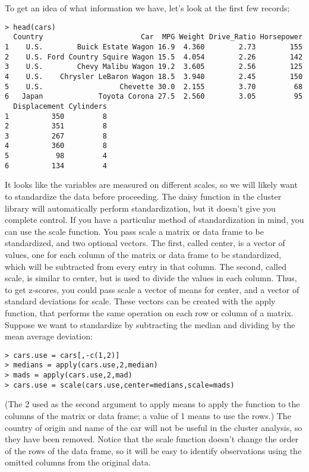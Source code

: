 {\begin{framed}
\begin{verbatim}
\end{verbatim}
\end{framed}
To get an idea of what information we have, let's look at the first few records;
\begin{framed}
\begin{verbatim} 
> head(cars) 
  Country                       Car  MPG Weight Drive_Ratio Horsepower
1    U.S.        Buick Estate Wagon 16.9  4.360        2.73        155
2    U.S. Ford Country Squire Wagon 15.5  4.054        2.26        142
3    U.S.        Chevy Malibu Wagon 19.2  3.605        2.56        125
4    U.S.    Chrysler LeBaron Wagon 18.5  3.940        2.45        150
5    U.S.                  Chevette 30.0  2.155        3.70         68
6   Japan             Toyota Corona 27.5  2.560        3.05         95
  Displacement Cylinders
1          350         8
2          351         8
3          267         8
4          360         8
5           98         4
6          134         4
\end{verbatim}
\end{framed}
It looks like the variables are measured on different scales, so we will likely want to standardize the data before proceeding. The daisy function in the cluster library will automatically perform standardization, but it doesn't give you complete control. If you have a particular method of standardization in mind, you can use the scale function. You pass scale a matrix or data frame to be standardized, and two optional vectors. The first, called center, is a vector of values, one for each column of the matrix or data frame to be standardized, which will be subtracted from every entry in that column. The second, called scale, is similar to center, but is used to divide the values in each column. Thus, to get z-scores, you could pass scale a vector of means for center, and a vector of standard deviations for scale. These vectors can be created with the apply function, that performs the same operation on each row or column of a matrix. Suppose we want to standardize by subtracting the median and dividing by the mean average deviation:
\begin{framed}
\begin{verbatim}
> cars.use = cars[,-c(1,2)]
> medians = apply(cars.use,2,median)
> mads = apply(cars.use,2,mad)
> cars.use = scale(cars.use,center=medians,scale=mads)
\end{verbatim}
\end{framed}
(The 2 used as the second argument to apply means to apply the function to the columns of the matrix or data frame; a value of 1 means to use the rows.) The country of origin and name of the car will not be useful in the cluster analysis, so they have been removed. Notice that the scale function doesn't change the order of the rows of the data frame, so it will be easy to identify observations using the omitted columns from the original data.
}
